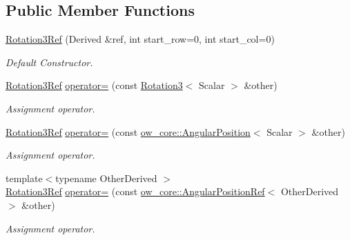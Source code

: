 \subsection*{Public Member Functions}
\begin{DoxyCompactItemize}
\item 
\hyperlink{classow__core_1_1Rotation3Ref_a109a235e716fbd277305288adba536fc}{Rotation3\+Ref} (Derived \&ref, int start\+\_\+row=0, int start\+\_\+col=0)\hypertarget{classow__core_1_1Rotation3Ref_a109a235e716fbd277305288adba536fc}{}\label{classow__core_1_1Rotation3Ref_a109a235e716fbd277305288adba536fc}

\begin{DoxyCompactList}\small\item\em Default Constructor. \end{DoxyCompactList}\item 
\hyperlink{classow__core_1_1Rotation3Ref}{Rotation3\+Ref} \hyperlink{classow__core_1_1Rotation3Ref_afda2d08d799afa615d6faddf933595eb}{operator=} (const \hyperlink{classow__core_1_1Rotation3}{Rotation3}$<$ Scalar $>$ \&other)\hypertarget{classow__core_1_1Rotation3Ref_afda2d08d799afa615d6faddf933595eb}{}\label{classow__core_1_1Rotation3Ref_afda2d08d799afa615d6faddf933595eb}

\begin{DoxyCompactList}\small\item\em Assignment operator. \end{DoxyCompactList}\item 
\hyperlink{classow__core_1_1Rotation3Ref}{Rotation3\+Ref} \hyperlink{classow__core_1_1Rotation3Ref_aab70e95009f4e66addc3e64d00541735}{operator=} (const \hyperlink{classow__core_1_1AngularPosition}{ow\+\_\+core\+::\+Angular\+Position}$<$ Scalar $>$ \&other)\hypertarget{classow__core_1_1Rotation3Ref_aab70e95009f4e66addc3e64d00541735}{}\label{classow__core_1_1Rotation3Ref_aab70e95009f4e66addc3e64d00541735}

\begin{DoxyCompactList}\small\item\em Assignment operator. \end{DoxyCompactList}\item 
{\footnotesize template$<$typename Other\+Derived $>$ }\\\hyperlink{classow__core_1_1Rotation3Ref}{Rotation3\+Ref} \hyperlink{classow__core_1_1Rotation3Ref_aeb4657307504262657c363633cf7c259}{operator=} (const \hyperlink{classow__core_1_1AngularPositionRef}{ow\+\_\+core\+::\+Angular\+Position\+Ref}$<$ Other\+Derived $>$ \&other)\hypertarget{classow__core_1_1Rotation3Ref_aeb4657307504262657c363633cf7c259}{}\label{classow__core_1_1Rotation3Ref_aeb4657307504262657c363633cf7c259}

\begin{DoxyCompactList}\small\item\em Assignment operator. \end{DoxyCompactList}\end{DoxyCompactItemize}


